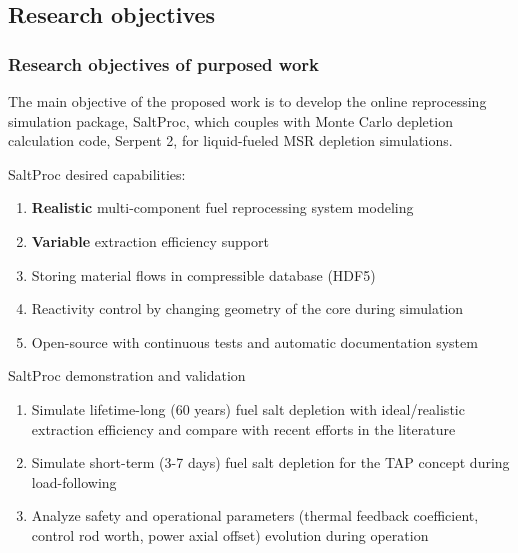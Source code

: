 \subsection{Research objectives}

\begin{frame}
  \frametitle{Research objectives of purposed work}
                  \vspace*{-0.05in}
      The main objective of the proposed work is to develop the online 
      reprocessing simulation package, SaltProc, which couples with Monte 
      Carlo depletion calculation code, Serpent 2, for liquid-fueled MSR 
      depletion simulations.
     \begin{block}{SaltProc desired capabilities:}
         \begin{enumerate}
                \item \textbf{Realistic} multi-component fuel reprocessing 
                system modeling
                \item \textbf{Variable} extraction efficiency support
                \item Storing material flows in compressible database (HDF5)
                \item Reactivity control by changing geometry of the core 
                during simulation
                \item Open-source with continuous tests and automatic 
                documentation system 
         \end{enumerate}
      \end{block}
            \vspace{-0.1in}
	\begin{block}{SaltProc demonstration and validation}
		\begin{enumerate}
			\item Simulate lifetime-long (60 years) fuel salt depletion with 
			ideal/realistic extraction efficiency and compare with recent 
			efforts in the literature
			\item Simulate short-term (3-7 days) fuel salt depletion for the 
			\gls{TAP} concept during load-following
			\item Analyze safety and operational parameters (thermal feedback 
			coefficient, control rod worth, power axial offset) evolution 
			during operation 
		\end{enumerate}
	\end{block}
\end{frame}